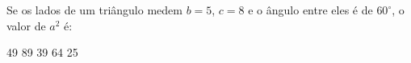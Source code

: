 Se os lados de um triângulo medem $b=5$, $c=8$ e o ângulo entre eles é de $60^\circ$, o valor de $a^2$ é:

\parbox{0.3\linewidth}{

49
89
39
64
25

}


